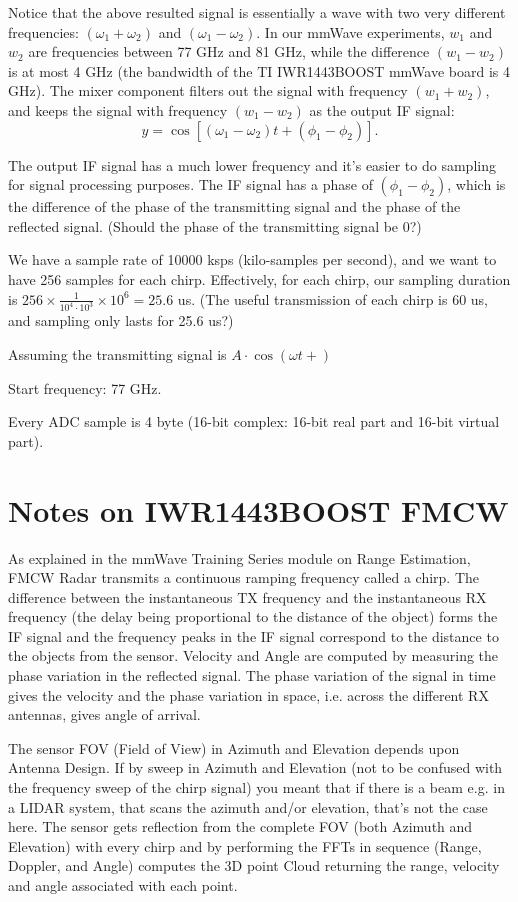 \documentclass[11pt, oneside]{article}   	%
\begin{document}
Notice that the above resulted signal is essentially a wave with two very different frequencies: $(\omega_1 + \omega_2)$ and $(\omega_1 - \omega_2)$. In our mmWave experiments, $w_1$ and $w_2$ are frequencies between 77 GHz and 81 GHz, while the difference $(w_1 - w_2)$ is at most 4 GHz (the bandwidth of the TI IWR1443BOOST mmWave board is 4 GHz). The mixer component filters out the signal with frequency $(w_1 + w_2)$, and keeps the signal with frequency  $(w_1 - w_2)$ as the output IF signal:
$$y = \cos\left[(\omega_1 - \omega_2) t + (\phi_1 - \phi_2)\right].$$

The output IF signal has a much lower frequency and it's easier to do sampling for signal processing purposes. The IF signal has a phase of $(\phi_1 - \phi_2)$, which is the difference of the phase of the transmitting signal and the phase of the reflected signal. (Should the phase of the transmitting signal be 0?)

We have a sample rate of 10000 ksps (kilo-samples per second), and we want to have 256 samples for each chirp. Effectively, for each chirp, our sampling duration is $256\times\frac{1}{10^4\cdot 10^3}\times 10^6 = 25.6$ us. (The useful transmission of each chirp is 60 us, and sampling only lasts for 25.6 us?)

Assuming the transmitting signal is $A\cdot \cos(\omega t + )$

Start frequency: 77 GHz.

Every ADC sample is 4 byte (16-bit complex: 16-bit real part and 16-bit virtual part).


\section{Notes on IWR1443BOOST FMCW}
As explained in the mmWave Training Series module on Range Estimation, FMCW Radar transmits a continuous ramping frequency called a chirp. The difference between the instantaneous TX frequency and the instantaneous RX frequency (the delay being proportional to the distance of the object) forms the IF signal and the frequency peaks in the IF signal correspond to the distance to the objects from the sensor. Velocity and Angle are computed by measuring the phase variation in the reflected signal. The phase variation of the signal in time gives the velocity and the phase variation in space, i.e. across the different RX antennas, gives angle of arrival.

The sensor FOV (Field of View) in Azimuth and Elevation depends upon Antenna Design. If by sweep in Azimuth and Elevation (not to be confused with the frequency sweep of the chirp signal) you meant that if there is a beam e.g. in a LIDAR system, that scans the azimuth and/or elevation, that's not the case here. The sensor gets reflection from the complete FOV (both Azimuth and Elevation) with every chirp and by performing the FFTs in sequence (Range, Doppler, and Angle) computes the 3D point Cloud returning the range, velocity and angle associated with each point.
\end{document}
